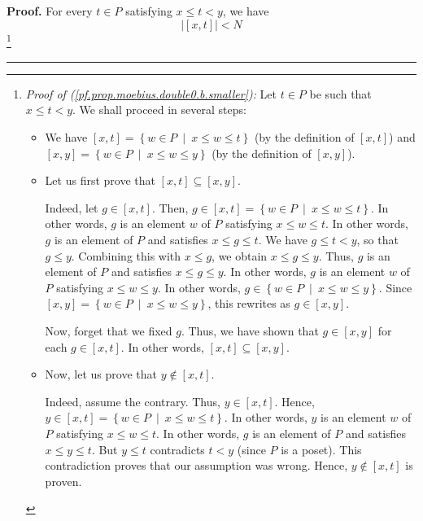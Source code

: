 \documentclass[numbers=enddot,12pt,final,onecolumn,notitlepage]{scrartcl}%
\theoremstyle{definition}
\newenvironment{proof}[1][Proof]{\noindent\textbf{#1.} }{\ \rule{0.5em}{0.5em}}
\newenvironment{verlong}{}{}
\begin{document}
\begin{verlong}
\begin{proof}
For every $t\in P$ satisfying $x\leq t<y$, we have%
\begin{equation}
\left\vert \left[  x,t\right]  \right\vert <N
\label{pf.prop.moebius.double0.b.smaller}%
\end{equation}
\footnote{\textit{Proof of (\ref{pf.prop.moebius.double0.b.smaller}):} Let
$t\in P$ be such that $x\leq t<y$. We shall proceed in several steps:
\par
\begin{itemize}
\item We have $\left[  x,t\right]  =\left\{  w\in P\ \mid\ x\leq w\leq
t\right\}  $ (by the definition of $\left[  x,t\right]  $) and $\left[
x,y\right]  =\left\{  w\in P\ \mid\ x\leq w\leq y\right\}  $ (by the
definition of $\left[  x,y\right]  $).
\par
\item Let us first prove that $\left[  x,t\right]  \subseteq\left[
x,y\right]  $.
\par
Indeed, let $g\in\left[  x,t\right]  $. Then, $g\in\left[  x,t\right]
=\left\{  w\in P\ \mid\ x\leq w\leq t\right\}  $. In other words, $g$ is an
element $w$ of $P$ satisfying $x\leq w\leq t$. In other words, $g$ is an
element of $P$ and satisfies $x\leq g\leq t$. We have $g\leq t<y$, so that
$g\leq y$. Combining this with $x\leq g$, we obtain $x\leq g\leq y$. Thus, $g$
is an element of $P$ and satisfies $x\leq g\leq y$. In other words, $g$ is an
element $w$ of $P$ satisfying $x\leq w\leq y$. In other words, $g\in\left\{
w\in P\ \mid\ x\leq w\leq y\right\}  $. Since $\left[  x,y\right]  =\left\{
w\in P\ \mid\ x\leq w\leq y\right\}  $, this rewrites as $g\in\left[
x,y\right]  $.
\par
Now, forget that we fixed $g$. Thus, we have shown that $g\in\left[
x,y\right]  $ for each $g\in\left[  x,t\right]  $. In other words, $\left[
x,t\right]  \subseteq\left[  x,y\right]  $.
\par
\item Now, let us prove that $y\notin\left[  x,t\right]  $.
\par
Indeed, assume the contrary. Thus, $y\in\left[  x,t\right]  $. Hence,
$y\in\left[  x,t\right]  =\left\{  w\in P\ \mid\ x\leq w\leq t\right\}  $. In
other words, $y$ is an element $w$ of $P$ satisfying $x\leq w\leq t$. In other
words, $g$ is an element of $P$ and satisfies $x\leq y\leq t$. But $y\leq t$
contradicts $t<y$ (since $P$ is a poset). This contradiction proves that our
assumption was wrong. Hence, $y\notin\left[  x,t\right]  $ is proven.
\par

\end{itemize}}
\end{proof}
\end{verlong}
\end{document}
